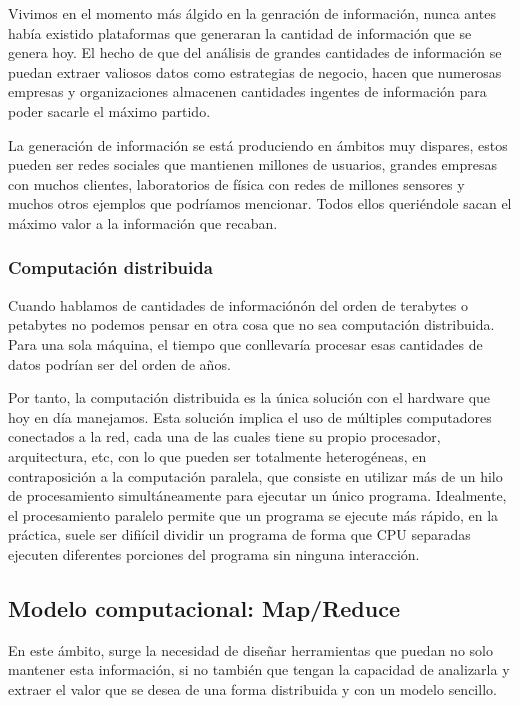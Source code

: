 Vivimos en el momento m\'as \'algido en la genraci\'on de informaci\'on, nunca antes había existido plataformas que generaran la cantidad de información que se genera hoy. El hecho de que del análisis de grandes cantidades de información se puedan extraer valiosos datos como estrategias de negocio, hacen que numerosas empresas y organizaciones almacenen cantidades ingentes de información para poder sacarle el máximo partido.

La generaci\'on de informaci\'on se est\'a produciendo en \'ambitos muy dispares, estos pueden ser redes sociales que mantienen millones de usuarios, grandes empresas con muchos clientes, laboratorios de f\'isica con redes de millones sensores y muchos otros ejemplos que podríamos mencionar. Todos ellos queriéndole sacan el máximo valor a la información que recaban.

\subsubsection{Computaci\'on distribuida}

Cuando hablamos de cantidades de información\'on del orden de terabytes o petabytes no podemos pensar en otra cosa que no sea computación distribuida. Para una sola m\'aquina, el tiempo que conllevar\'ia procesar esas cantidades de datos podr\'ian ser del orden de a\~nos.

Por tanto, la computaci\'on distribuida es la \'unica soluci\'on con el hardware que hoy en d\'ia manejamos. Esta soluci\'on implica el uso de m\'ultiples computadores conectados a la red, cada una de las cuales tiene su propio procesador, arquitectura, etc, con lo que pueden ser totalmente heterog\'eneas, en contraposici\'on a la computaci\'on paralela, que consiste en utilizar m\'as de un hilo de procesamiento simult\'aneamente para ejecutar un \'unico programa. Idealmente, el procesamiento paralelo permite que un programa se ejecute m\'as r\'apido, en la pr\'actica, suele ser difi\'icil dividir un programa de forma que CPU separadas ejecuten diferentes porciones del programa sin ninguna interacci\'on.

\subsection{Modelo computacional: Map/Reduce}

En este \'ambito, surge la necesidad de dise\~nar herramientas que puedan no solo mantener esta informaci\'on, si no también que tengan la capacidad de analizarla y extraer el valor que se desea de una forma distribuida y con un modelo sencillo. 

